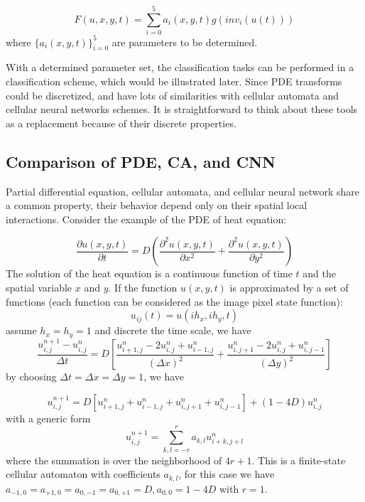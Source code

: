 \documentclass{amsart}
\theoremstyle{definition}
\theoremstyle{remark}
\numberwithin{equation}{section}
\begin{document}
\begin{equation}
F(u, x, y, t) = \sum_{i=0}^5 a_i(x, y, t) g(inv_i(u(t)))
\end{equation}
where $\{a_i(x, y, t)\}_{i=0}^5$ are parameters to be determined.

With a determined parameter set, the classification tasks can be performed in a classification scheme, which would be illustrated later.
Since PDE transforms could be discretized, and have lots of similarities with cellular automata and cellular neural networks schemes. 
It is straightforward to think about these tools as a replacement because of their discrete properties.



\subsection{Comparison of PDE, CA, and CNN}
Partial differential equation, cellular automata, and cellular neural network share a common property, their behavior depend only on their spatial local interactions.
Consider the example of the PDE of heat equation:

\begin{equation}
\label{heatequation}
\frac{\partial u(x, y, t)}{\partial t} = D \left( \frac{\partial^2 u(x,y,t)}{\partial{x}^2} + \frac{\partial^2 u(x,y,t)}{\partial{y}^2} \right) 
\end{equation}
The solution of the heat equation is a continuous function of time $t$ and the spatial variable $x$ and $y$.
If the function $u(x, y, t) $ is approximated by a set of functions (each function can be considered as the image pixel state function):
\begin{equation}
u_{ij}(t) = u(ih_x, ih_y, t)
\end{equation}
assume $h_x = h_y = 1$ and discrete the time scale, we have
\begin{equation}
\frac{u_{i, j}^{n+1} - u_{i, j}^n}{\Delta t} = D \left[ \frac{u_{i+1, j}^n - 2u_{i, j}^n + u_{i-1, j}^n}{(\Delta x)^2} + \frac{u_{i, j+1}^n - 2u_{i, j}^n + u_{i,  j-1}^n}{(\Delta y)^2}\right] 
\end{equation}
by choosing $\Delta t = \Delta x = \Delta y =1$, we have

\begin{equation}
u_{i, j}^{n+1} = D[u_{i+1, j}^n + u_{i-1, j}^n + u_{i, j+1}^n + u_{i, j-1}^n]  + (1 - 4D)u_{i, j}^n
\end{equation}
with a generic form
\begin{equation}
u_{i, j} ^{n+1} = \sum_{k, l = -r}^r a_{k, l} u_{i+k, j +l}^n
\end{equation}
where the summation is over the neighborhood of $4r+1$. 
This is a finite-state cellular automaton with coefficients $a_{k, l} $, for this case we have $a_{-1, 0} = a_{+1, 0} = a_{0, -1} = a_{0, +1} = D, a_{0, 0} = 1-4D$ with $r=1$.
\end{document}
